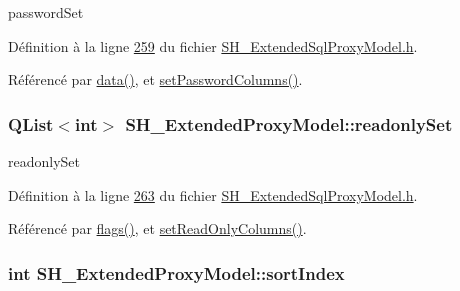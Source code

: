password\-Set 



Définition à la ligne \hyperlink{SH__ExtendedSqlProxyModel_8h_source_l00259}{259} du fichier \hyperlink{SH__ExtendedSqlProxyModel_8h_source}{S\-H\-\_\-\-Extended\-Sql\-Proxy\-Model.\-h}.



Référencé par \hyperlink{classSH__ExtendedProxyModel_afbc947efbe1107fc5bf8926c52902a1c}{data()}, et \hyperlink{classSH__ExtendedProxyModel_a79389378df6e07a2affb721216ac6961}{set\-Password\-Columns()}.

\hypertarget{classSH__ExtendedProxyModel_ad8e1da8be7d34eefe243a7707be8b166}{
\subsubsection[{readonly\-Set}]{\setlength{\rightskip}{0pt plus 5cm}Q\-List$<$int$>$ S\-H\-\_\-\-Extended\-Proxy\-Model\-::readonly\-Set\hspace{0.3cm}{\ttfamily [private]}}}\label{classSH__ExtendedProxyModel_ad8e1da8be7d34eefe243a7707be8b166}


readonly\-Set 



Définition à la ligne \hyperlink{SH__ExtendedSqlProxyModel_8h_source_l00263}{263} du fichier \hyperlink{SH__ExtendedSqlProxyModel_8h_source}{S\-H\-\_\-\-Extended\-Sql\-Proxy\-Model.\-h}.



Référencé par \hyperlink{classSH__ExtendedProxyModel_a0fed636838c17a8a027a3d1968e5bcf0}{flags()}, et \hyperlink{classSH__ExtendedProxyModel_ada56eb3eda9b0a1024d7b54e4f30ddb3}{set\-Read\-Only\-Columns()}.

\hypertarget{classSH__ExtendedProxyModel_a83cabe4cf90a26d26c4aaa40e944b2bd}{
\subsubsection[{sort\-Index}]{\setlength{\rightskip}{0pt plus 5cm}int S\-H\-\_\-\-Extended\-Proxy\-Model\-::sort\-Index\hspace{0.3cm}{\ttfamily [private]}}}\label{classSH__ExtendedProxyModel_a83cabe4cf90a26d26c4aaa40e944b2bd}


